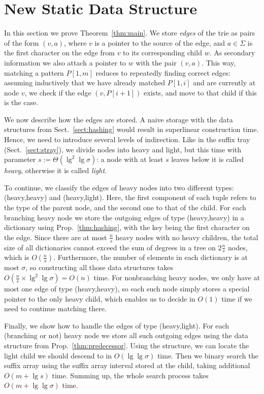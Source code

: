 \documentclass[11pt,onecolumn,final]{article} \usepackage{a4}
\theoremstyle{plain}
\theoremstyle{remark}
\begin{document}
\section{New Static Data Structure}
In this section we prove Theorem~\ref{thm:main}. We store \emph{edges} of the trie as pairs of the form $(v,a)$, where $v$ is a pointer to the source of the edge, and $a\in\Sigma$ is the first character on the edge from $v$ to its corresponding child $w$. As secondary information we also attach a pointer to $w$ with the pair $(v,a)$. This way, matching a pattern $P[1,m]$ reduces to repeatedly finding correct edges: assuming inductively that we have already matched $P[1,i]$ and are currently at node $v$, we check if the edge $(v,P[i+1])$ exists, and move to that child if this is the case.

We now describe how the edges are stored. A naive storage with the data structures from Sect.~\ref{sect:hashing} would result in superlinear construction time. Hence, we need to introduce several levels of indirection. Like in the suffix tray (Sect.~\ref{sect:stray}), we divide nodes into heavy and light, but this time with parameter $s := \Theta(\lg^2\lg\sigma)$: a node with at least $s$ leaves below it is called \emph{heavy}, otherwise it is called \emph{light}. 

To continue, we classify the edges of heavy nodes into two different types: (heavy,heavy) and (heavy,light). Here, the first component of each tuple refers to the type of the parent node, and the second one to that of the child. For each branching heavy node we store the outgoing edges of type (heavy,heavy) in a dictionary using Prop.~\ref{thm:hashing}, with the key being the first character on the edge. Since there are at most $\frac{n}{s}$ heavy nodes with no heavy children, the total size of all dictionaries cannot exceed the sum of degrees in a tree on $2\frac{n}{s}$ nodes, which
is $O(\frac{n}{s})$. Furthermore,
the number of elements in each dictionary is at most $\sigma$, so constructing all those data structures takes $O(\frac{n}{s} \times \lg^2\lg\sigma) = O(n)$ time. For nonbranching heavy nodes, we only have at most one edge of type (heavy,heavy), so each such node simply stores a special pointer to the only heavy child, which enables us to decide in $O(1)$ time if we need to continue matching there.

Finally, we show how to handle the edges of type (heavy,light). For each (branching or not) heavy node we store all such outgoing edges using the data structure from Prop.~\ref{thm:predecessor}. Using the structure, we can locate the light child we should descend to in $O(\lg\lg\sigma)$ time. Then we binary search the suffix array using the suffix array interval stored at the child, taking additional $O(m+\lg s)$ time. Summing up, the whole search process takes $O(m+\lg\lg\sigma)$ time.
\end{document}
